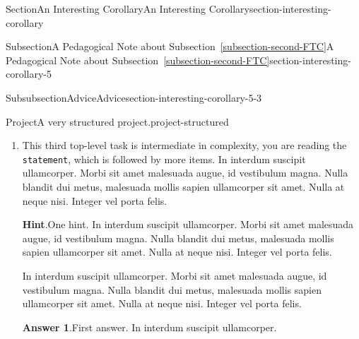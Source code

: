 \documentclass[twoside,10pt,]{article}
\newcommand{\blocktitlefont}{\relax}
\newcommand{\xreffont}{\relax}
\newcommand{\mono}[1]{\texttt{#1}}
\numberwithin{equation}{section}
\begin{document}
\begin{sectionptx}{Section}{An Interesting Corollary}{}{An Interesting Corollary}{}{}{section-interesting-corollary}
\begin{subsectionptx}{Subsection}{A Pedagogical Note about Subsection~{\xreffont\ref*{subsection-second-FTC}}}{}{A Pedagogical Note about Subsection~{\xreffont\ref*{subsection-second-FTC}}}{}{}{section-interesting-corollary-5}
\begin{subsubsectionptx}{Subsubsection}{Advice}{}{Advice}{}{}{section-interesting-corollary-5-3}
\begin{project}{Project}{A very structured project.}{project-structured}
\begin{enumerate}[font=\bfseries,label=(\alph*),ref=\alph*]
\begin{enumerate}[font=\bfseries,label=(\roman*),ref=\theenumi.\roman*]
\begin{enumerate}[font=\bfseries,label=(\Alph*),ref=\theenumi.\theenumii.\Alph*]
In interdum suscipit ullamcorper. Morbi sit amet malesuada augue, id vestibulum magna. Nulla blandit dui metus, malesuada mollis sapien ullamcorper sit amet. Nulla at neque nisi. Integer vel porta felis.%
\end{enumerate}%
The conclusion of the structured subtask.  In interdum suscipit ullamcorper. Morbi sit amet malesuada augue, id vestibulum magna. Nulla blandit dui metus, malesuada mollis sapien ullamcorper sit amet. Nulla at neque nisi. Integer vel porta felis.%
\item{}A simple task as the last subtask.  In interdum suscipit ullamcorper. Morbi sit amet malesuada augue, id vestibulum magna. Nulla blandit dui metus, malesuada mollis sapien ullamcorper sit amet. Nulla at neque nisi. Integer vel porta felis.%
\end{enumerate}%
This concludes our structured second task.  In interdum suscipit ullamcorper. Morbi sit amet malesuada augue, id vestibulum magna. Nulla blandit dui metus, malesuada mollis sapien ullamcorper sit amet. Nulla at neque nisi. Integer vel porta felis.%
\item{}This third top-level task is intermediate in complexity, you are reading the \mono{statement}, which is followed by more items. In interdum suscipit ullamcorper. Morbi sit amet malesuada augue, id vestibulum magna. Nulla blandit dui metus, malesuada mollis sapien ullamcorper sit amet. Nulla at neque nisi. Integer vel porta felis.%
\par\smallskip%
\noindent\textbf{\blocktitlefont Hint}.\hypertarget{project-structured-7-2}{}\quad{}One hint.  In interdum suscipit ullamcorper. Morbi sit amet malesuada augue, id vestibulum magna. Nulla blandit dui metus, malesuada mollis sapien ullamcorper sit amet. Nulla at neque nisi. Integer vel porta felis.%
\par
In interdum suscipit ullamcorper. Morbi sit amet malesuada augue, id vestibulum magna. Nulla blandit dui metus, malesuada mollis sapien ullamcorper sit amet. Nulla at neque nisi. Integer vel porta felis.%
\par\smallskip%
\noindent\textbf{\blocktitlefont Answer 1}.\hypertarget{project-structured-7-3}{}\quad{}First answer.  In interdum suscipit ullamcorper.%
\par\smallskip%

\end{enumerate}
\end{project}
\end{subsubsectionptx}
\end{subsectionptx}
\end{sectionptx}
\end{document}
